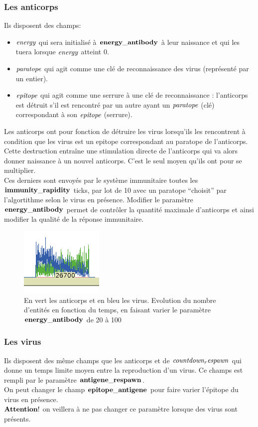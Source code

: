 \documentclass[11pt]{article} %
\numberwithin{equation}{section} %
\begin{document}
\subsubsection{Les anticorps}
Ils disposent des champs:
\begin{itemize}
	\item $\it{energy}$ qui sera initialisé à $\bf{energy\_antibody}$ à leur naissance et qui les tuera lorsque $\it{energy}$ atteint 0.
	\item $\it{paratope}$ qui agit comme une clé de reconnaissance des virus (représenté par un entier).
	\item $\it{epitope}$ qui agit comme une serrure à une clé de reconnaissance : l'anticorps est détruit s'il est rencontré par un autre ayant un $\it{paratope}$ (clé) correspondant à son $\it{epitope}$ (serrure).
\end{itemize}
Les anticorps ont pour fonction de détruire les virus lorsqu'ils les rencontrent à condition que les virus est un epitope correspondant au paratope de l'anticorps. Cette destruction entraîne une stimulation directe de l'anticorps qui va alors donner naissance à un nouvel anticorps. C'est le seul moyen qu'ils ont pour se multiplier.
\\
Ces derniers sont envoyés par le système immunitaire toutes les $\bf{immunity\_rapidity}$ ticks, par lot de 10 avec un paratope ``choisit'' par l'algortithme selon le virus en présence.
Modifier le paramètre $\bf{energy\_antibody}$ permet de contrôler la quantité maximale d'anticorps et ainsi modifier la qualité de la réponse immunitaire.
\begin{figure}
	\center
	\includegraphics{energy_antigene.png}
	\caption{En vert les anticorps et en bleu les virus. Evolution du nombre d'entités en fonction du temps, en faisant varier le paramètre $\bf{energy\_antibody}$ de 20 à 100}
\end{figure}

\subsubsection{Les virus}
Ils disposent des même champs que les anticorps et de $\it{countdown_respawn}$ qui donne un temps limite moyen entre la reproduction d'un virus. Ce champs est rempli par le paramètre $\bf{antigene\_respawn}$.
\\
On peut changer le champ $\bf{epitope\_antigene}$ pour faire varier l'épitope du virus en présence.
\\
{ \color{red} $\bf{Attention!}$ on veillera à ne pas changer ce paramètre lorsque des virus sont présents.}
\end{document}
